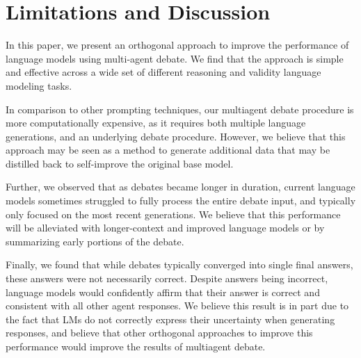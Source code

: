 \vspace{-8pt}
\section{Limitations and Discussion}
\vspace{-3pt}

In this paper, we present an orthogonal approach to improve the performance of language models using multi-agent debate. We find that the approach is simple and effective across a wide set of different reasoning and validity language modeling tasks.

 In comparison to other prompting techniques, our multiagent debate procedure is more computationally expensive, as it requires both multiple language generations, and an underlying debate procedure. However, we believe that this approach may be seen as a method to generate additional data that may be distilled back to self-improve the original base model.

Further, we observed that as debates became longer in duration, current language models sometimes struggled to fully process the entire debate input, and typically only focused on the most recent generations. We believe that this performance will be alleviated with longer-context and improved language models or by summarizing early portions of the debate.

Finally, we found that while debates typically converged into single final answers, these answers were not necessarily correct. Despite answers being incorrect, language models would confidently affirm that their answer is correct and consistent with all other agent responses. We believe this result is in part due to the fact that LMs do not correctly express their uncertainty when generating responses, and believe that other orthogonal approaches to improve this performance would improve the results of multiagent debate.